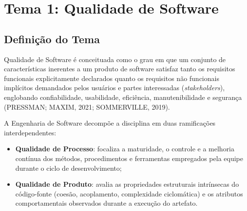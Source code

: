 \documentclass[12pt,a4paper]{article}
\begin{document}
\section{Tema 1: Qualidade de Software}

\subsection{Definição do Tema}
Qualidade de Software é conceituada como o grau em que um conjunto de características inerentes a um produto de software satisfaz tanto os requisitos funcionais explicitamente declarados quanto os requisitos não funcionais implícitos demandados pelos usuários e partes interessadas (\textit{stakeholders}), englobando confiabilidade, usabilidade, eficiência, manutenibilidade e segurança (PRESSMAN; MAXIM, 2021; SOMMERVILLE, 2019).

A Engenharia de Software decompõe a disciplina em duas ramificações interdependentes:
\begin{itemize}
    \item \textbf{Qualidade de Processo}: focaliza a maturidade, o controle e a melhoria contínua dos métodos, procedimentos e ferramentas empregados pela equipe durante o ciclo de desenvolvimento;
    \item \textbf{Qualidade de Produto}: avalia as propriedades estruturais intrínsecas do código-fonte (coesão, acoplamento, complexidade ciclomática) e os atributos comportamentais observados durante a execução do artefato.
\end{itemize}
\end{document}
